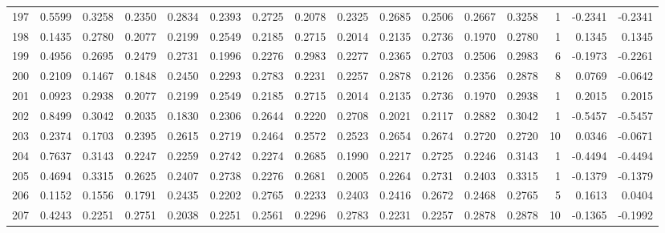 \begin{tabular}{lrrrrrrrrrrrrrrr}
197 &      0.5599 &  0.3258 &  0.2350 &  0.2834 &  0.2393 &  0.2725 &  0.2078 &  0.2325 &  0.2685 &  0.2506 &   0.2667 &     0.3258 &      1 &                   -0.2341 &                    -0.2341 \\
198 &      0.1435 &  0.2780 &  0.2077 &  0.2199 &  0.2549 &  0.2185 &  0.2715 &  0.2014 &  0.2135 &  0.2736 &   0.1970 &     0.2780 &      1 &                    0.1345 &                     0.1345 \\
199 &      0.4956 &  0.2695 &  0.2479 &  0.2731 &  0.1996 &  0.2276 &  0.2983 &  0.2277 &  0.2365 &  0.2703 &   0.2506 &     0.2983 &      6 &                   -0.1973 &                    -0.2261 \\
200 &      0.2109 &  0.1467 &  0.1848 &  0.2450 &  0.2293 &  0.2783 &  0.2231 &  0.2257 &  0.2878 &  0.2126 &   0.2356 &     0.2878 &      8 &                    0.0769 &                    -0.0642 \\
201 &      0.0923 &  0.2938 &  0.2077 &  0.2199 &  0.2549 &  0.2185 &  0.2715 &  0.2014 &  0.2135 &  0.2736 &   0.1970 &     0.2938 &      1 &                    0.2015 &                     0.2015 \\
202 &      0.8499 &  0.3042 &  0.2035 &  0.1830 &  0.2306 &  0.2644 &  0.2220 &  0.2708 &  0.2021 &  0.2117 &   0.2882 &     0.3042 &      1 &                   -0.5457 &                    -0.5457 \\
203 &      0.2374 &  0.1703 &  0.2395 &  0.2615 &  0.2719 &  0.2464 &  0.2572 &  0.2523 &  0.2654 &  0.2674 &   0.2720 &     0.2720 &     10 &                    0.0346 &                    -0.0671 \\
204 &      0.7637 &  0.3143 &  0.2247 &  0.2259 &  0.2742 &  0.2274 &  0.2685 &  0.1990 &  0.2217 &  0.2725 &   0.2246 &     0.3143 &      1 &                   -0.4494 &                    -0.4494 \\
205 &      0.4694 &  0.3315 &  0.2625 &  0.2407 &  0.2738 &  0.2276 &  0.2681 &  0.2005 &  0.2264 &  0.2731 &   0.2403 &     0.3315 &      1 &                   -0.1379 &                    -0.1379 \\
206 &      0.1152 &  0.1556 &  0.1791 &  0.2435 &  0.2202 &  0.2765 &  0.2233 &  0.2403 &  0.2416 &  0.2672 &   0.2468 &     0.2765 &      5 &                    0.1613 &                     0.0404 \\
207 &      0.4243 &  0.2251 &  0.2751 &  0.2038 &  0.2251 &  0.2561 &  0.2296 &  0.2783 &  0.2231 &  0.2257 &   0.2878 &     0.2878 &     10 &                   -0.1365 &                    -0.1992 \\

\end{tabular}
